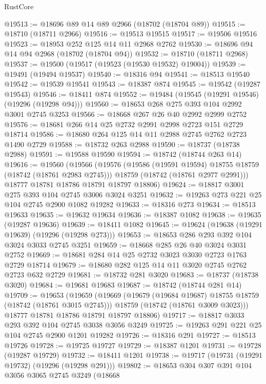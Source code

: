 \begin{lexlean}{RustCore}
\begin{coremodule}
@19513 := @18696 @89 @14 @89 @2966 (@18702 (@18704 @89))
@19515 := @18710 (@18711 @2966)
@19516 := @19513 @19515
@19517 := @19506 @19516
@19523 := @18953 @252 @125 @14 @11 @2968 @2762
@19530 := @18696 @94 @14 @94 @2968 (@18702 (@18704 @94))
@19532 := @18710 (@18711 @2968)
@19537 := @19500 (@19517 (@19523 (@19530 @19532) @19004))
@19539 := @19491 (@19494 @19537)
@19540 := @18316 @94
@19541 := @18513 @19540
@19542 := @19539 @19541
@19543 := @18387 @874
@19545 := @19542 (@19287 @19543)
@19546 := @18411 @874
@19552 := @19484 (@19545 (@19291 @19546) (@19296 (@19298 @94)))
@19560 := @18653 @268 @275 @393 @104 @2992 @3001 @2745 @3253
@19566 := @18668 @267 @26 @40 @2992 @2999 @2752
@19576 := @18681 @266 @14 @25 @2732 @2991 @2998 @2723 @151 @2729 @18714
@19586 := @18680 @264 @125 @14 @11 @2988 @2745 @2762 @2723 @1490 @2729
@19588 := @18732 @263 @2988
@19590 := @18737 (@18738 @2988)
@19591 := @19588 @19590
@19594 := @18742 (@18744 @263 @14)
@19616 := @19560
    (@19566
      (@19576
        (@19586 (@19591 @19594) @18755 @18759 (@18742 (@18761 @2983 @2745)))
        @18759
        (@18742 (@18761 @2977 @2991)))
      @18777
      @18781
      @18786
      @18791
      @18797
      @18806)
@19624 := @18817 @3001 @275 @393 @104 @2745 @3006 @3024 @3251
@19632 := @19263 @273 @221 @25 @104 @2745 @2900 @1082 @19282
@19633 := @18316 @273
@19634 := @18513 @19633
@19635 := @19632 @19634
@19636 := @18387 @1082
@19638 := @19635 (@19287 @19636)
@19639 := @18411 @1082
@19645 := @19624 (@19638 (@19291 @19639) (@19296 (@19298 @273)))
@19653 := @18653 @286 @293 @392 @104 @3024 @3033 @2745 @3251
@19659 := @18668 @285 @26 @40 @3024 @3031 @2752
@19669 := @18681 @284 @14 @25 @2732 @3023 @3030 @2723 @1763 @2729 @18714
@19679 := @18680 @282 @125 @14 @11 @3020 @2745 @2762 @2723 @632 @2729
@19681 := @18732 @281 @3020
@19683 := @18737 (@18738 @3020)
@19684 := @19681 @19683
@19687 := @18742 (@18744 @281 @14)
@19709 := @19653
    (@19659
      (@19669
        (@19679 (@19684 @19687) @18755 @18759 (@18742 (@18761 @3015 @2745)))
        @18759
        (@18742 (@18761 @3009 @3023)))
      @18777
      @18781
      @18786
      @18791
      @18797
      @18806)
@19717 := @18817 @3033 @293 @392 @104 @2745 @3038 @3056 @3249
@19725 := @19263 @291 @221 @25 @104 @2745 @2900 @1201 @19282
@19726 := @18316 @291
@19727 := @18513 @19726
@19728 := @19725 @19727
@19729 := @18387 @1201
@19731 := @19728 (@19287 @19729)
@19732 := @18411 @1201
@19738 := @19717 (@19731 (@19291 @19732) (@19296 (@19298 @291)))
@19802 := @18653
    @304
    @307
    @391
    @104
    @3056
    @3065
    @2745
    @3249
    (@18668

\end{coremodule}
\end{lexlean}
